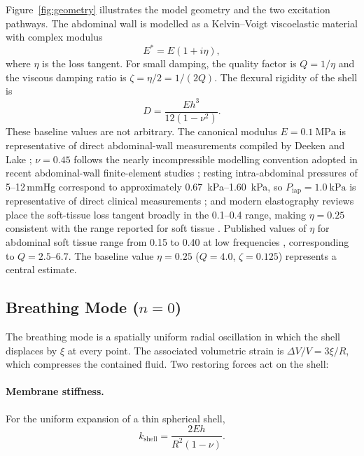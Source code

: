 Figure~\ref{fig:geometry} illustrates the model geometry and the two excitation
pathways.  The abdominal wall is modelled as a Kelvin--Voigt viscoelastic material with
complex modulus
\begin{equation}\label{eq:Estar}
  E^* = E(1 + i\eta),
\end{equation}
where $\eta$ is the loss tangent.  For small damping, the quality factor is
$Q = 1/\eta$ and the viscous damping ratio is $\zeta = \eta/2 = 1/(2Q)$.  The
flexural rigidity of the shell is
\begin{equation}\label{eq:D}
  D = \frac{Eh^3}{12(1 - \nu^2)}.
\end{equation}
These baseline values are not arbitrary.  The canonical modulus
$E = \SI{0.1}{\mega\pascal}$ is representative of direct abdominal-wall
measurements compiled by Deeken and Lake \cite{Deeken2017};
$\nu = 0.45$ follows the nearly incompressible modelling convention adopted in
recent abdominal-wall finite-element studies \cite{Spadoni2024}; resting
intra-abdominal pressures of 5--12\,mmHg correspond to approximately
\SIrange{0.67}{1.60}{\kilo\pascal}, so
$P_\mathrm{iap} = \SI{1.0}{\kilo\pascal}$ is representative of direct clinical
measurements \cite{Novak2021}; and modern elastography reviews place the
soft-tissue loss tangent broadly in the 0.1--0.4 range, making
$\eta = 0.25$ consistent with the range reported for soft tissue
\cite{Sack2023}.  Published values of $\eta$ for abdominal
soft tissue range from 0.15 to 0.40 at low frequencies
\cite{parker2011imaging}, corresponding to $Q = 2.5$--$6.7$.  The baseline
value $\eta = 0.25$ ($Q = 4.0$, $\zeta = 0.125$) represents a central estimate.


\subsection{Breathing Mode (\texorpdfstring{$n = 0$}{n = 0})}\label{sec:breathing}

The breathing mode is a spatially uniform radial oscillation in which the shell
displaces by $\xi$ at every point.  The associated volumetric strain is
$\Delta V/V = 3\xi/R$, which compresses the contained fluid.  Two restoring
forces act on the shell:

\paragraph{Membrane stiffness.}
For the uniform expansion of a thin spherical shell,
\begin{equation}\label{eq:kshell}
  k_\mathrm{shell} = \frac{2Eh}{R^2(1 - \nu)}.
\end{equation}

